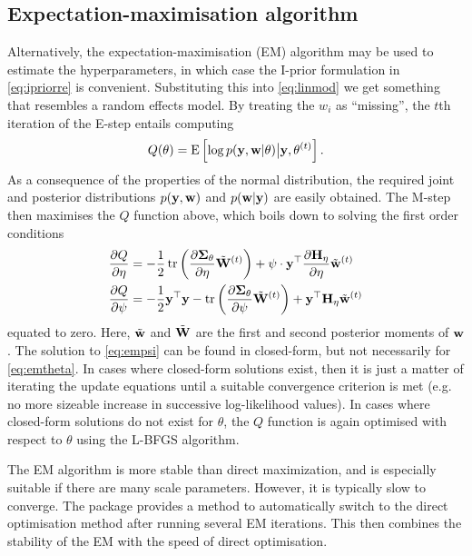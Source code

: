 \subsection{Expectation-maximisation algorithm}

Alternatively, the expectation-maximisation (EM) algorithm may be used to estimate the hyperparameters, in which case the I-prior formulation in \eqref{eq:ipriorre} is convenient.
Substituting this into \eqref{eq:linmod} we get something that resembles a random effects model.
By treating the $w_i$ as ``missing'', the $t$th iteration of the E-step entails computing
%
\begin{align}
  Q(\theta) = \operatorname{E} \left[ \log p({\mathbf y}, {\mathbf w} | \theta) \big\vert {\mathbf y},\theta^{(t)} \right].
\end{align}
%
As a consequence of the properties of the normal distribution, the required joint and posterior distributions $p({\mathbf y}, {\mathbf w})$ and $p({\mathbf w} | {\mathbf y})$ are easily obtained.
The M-step then maximises the $Q$ function above, which boils down to solving the first order conditions
%
\begin{align}
  \frac{\partial Q}{\partial\eta}
  &= -\frac{1}{2} \operatorname{tr} \left(\frac{\partial {\bm\Sigma}_\theta}{\partial\eta} \tilde{{\mathbf W}}^{(t)} \right) + \psi \cdot {\mathbf y} ^\top \frac{\partial {\mathbf H}_\eta}{\partial\eta} \tilde{{\mathbf w}}^{(t)} \label{eq:emtheta} \\
  \frac{\partial Q}{\partial\psi}
  &= -\frac{1}{2} {\mathbf y}^\top{\mathbf y} - \operatorname{tr} \left(\frac{\partial {\bm\Sigma}_\theta}{\partial\psi} \tilde{{\mathbf W}}^{(t)} \right) + {\mathbf y}^\top {\mathbf H}_\eta \tilde{{\mathbf w}}^{(t)} \label{eq:empsi}
\end{align}
%
equated to zero.
Here, $\tilde{{\mathbf w}}$ and $\tilde{{\mathbf W}}$ are the first and second posterior moments of ${\mathbf w}$.
The solution to \eqref{eq:empsi} can be found in closed-form, but not necessarily for \eqref{eq:emtheta}.
In cases where closed-form solutions exist, then it is just a matter of iterating the update equations until a suitable convergence criterion is met (e.g. no more sizeable increase in successive log-likelihood values).
In cases where closed-form solutions do not exist for $\theta$, the $Q$ function is again optimised with respect to $\theta$ using the L-BFGS algorithm.

The EM algorithm is more stable than direct maximization, and is especially suitable if there are many scale parameters. However, it is typically slow to converge.
The  package provides a method to automatically switch to the direct optimisation method after running several EM iterations.
This then combines the stability of the EM with the speed of direct optimisation.

